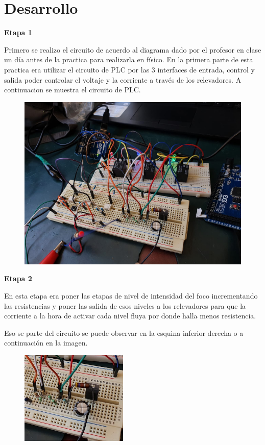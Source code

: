 \documentclass[10pt,a4paper]{article}
\begin{document}
\section{Desarrollo}
\textbf{Etapa 1}

Primero se realizo el circuito de acuerdo al diagrama dado por el profesor en clase un día antes de la practica para realizarla en físico. En la primera parte de esta practica era utilizar el circuito de PLC por las 3 interfaces de entrada, control y salida poder controlar el voltaje y la corriente a través de los relevadores. A continuacion se muestra el circuito de PLC.

\begin{figure}[hbtp]
\centering
\includegraphics[scale=0.60]{1.png}
\end{figure}

\textbf{Etapa 2}

En esta etapa era poner las etapas de nivel de intensidad del foco incrementando las resistencias y poner las salida de esos niveles a los relevadores para que la corriente a la hora de activar cada nivel fluya por donde halla menos resistencia.

Eso se parte del circuito se puede observar en la esquina inferior derecha o a continuación en la imagen.

\begin{figure}[hbtp]
\centering
\includegraphics[scale=0.60]{2.png}
\end{figure}
 
\end{document}
